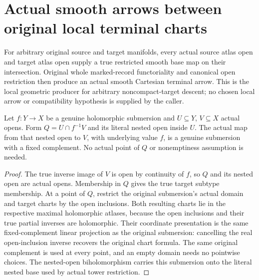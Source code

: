 \section{Actual smooth arrows between original local terminal charts}

For arbitrary original source and target manifolds, every actual source atlas
open and target atlas open supply a true restricted smooth base map on their
intersection. Original whole marked-record functoriality and canonical open
restriction then produce an actual smooth Cartesian terminal arrow. This is
the local geometric producer for arbitrary noncompact-target descent; no
chosen local arrow or compatibility hypothesis is supplied by the caller.

\begin{lemma}
\label{hir:original-smooth-chart-intersection-actual-submersion}
\leanok
{}
Let $f:Y\to X$ be a genuine holomorphic submersion and $U\subseteq Y$,
$V\subseteq X$ actual opens. Form $Q=U\cap f^{-1}V$ and its literal
nested open inside $U$. The actual map from that nested open to $V$,
with underlying value $f$, is a genuine submersion with a fixed complement.
No actual point of $Q$ or nonemptiness assumption is needed.
\end{lemma}
\begin{proof}
The true inverse image of $V$ is open by continuity of $f$, so $Q$ and
its nested open are actual opens. Membership in $Q$ gives the true target
subtype membership. At a point of $Q$, restrict the original submersion's
actual domain and target charts by the open inclusions. Both resulting
charts lie in the respective maximal holomorphic atlases, because the
open inclusions and their true partial inverses are holomorphic. Their
coordinate presentation is the same fixed-complement linear projection
as the original submersion: cancelling the real open-inclusion inverse
recovers the original chart formula. The same original complement is
used at every point, and an empty domain needs no pointwise choices.
The nested-open biholomorphism carries this submersion onto the literal
nested base used by actual tower restriction.
\end{proof}

